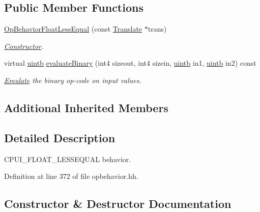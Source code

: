 \subsection*{Public Member Functions}
\begin{DoxyCompactItemize}
\item 
\mbox{\hyperlink{class_op_behavior_float_less_equal_a6c87c6980d8547b66b4810cead4e7389}{Op\+Behavior\+Float\+Less\+Equal}} (const \mbox{\hyperlink{class_translate}{Translate}} $\ast$trans)
\begin{DoxyCompactList}\small\item\em \mbox{\hyperlink{class_constructor}{Constructor}}. \end{DoxyCompactList}\item 
virtual \mbox{\hyperlink{types_8h_a2db313c5d32a12b01d26ac9b3bca178f}{uintb}} \mbox{\hyperlink{class_op_behavior_float_less_equal_ad1a81020d476b4a23744e04e080ba8aa}{evaluate\+Binary}} (int4 sizeout, int4 sizein, \mbox{\hyperlink{types_8h_a2db313c5d32a12b01d26ac9b3bca178f}{uintb}} in1, \mbox{\hyperlink{types_8h_a2db313c5d32a12b01d26ac9b3bca178f}{uintb}} in2) const
\begin{DoxyCompactList}\small\item\em \mbox{\hyperlink{class_emulate}{Emulate}} the binary op-\/code on input values. \end{DoxyCompactList}\end{DoxyCompactItemize}
\subsection*{Additional Inherited Members}


\subsection{Detailed Description}
C\+P\+U\+I\+\_\+\+F\+L\+O\+A\+T\+\_\+\+L\+E\+S\+S\+E\+Q\+U\+AL behavior. 

Definition at line 372 of file opbehavior.\+hh.



\subsection{Constructor \& Destructor Documentation}
\mbox{\label{class_op_behavior_float_less_equal_a6c87c6980d8547b66b4810cead4e7389}} 
